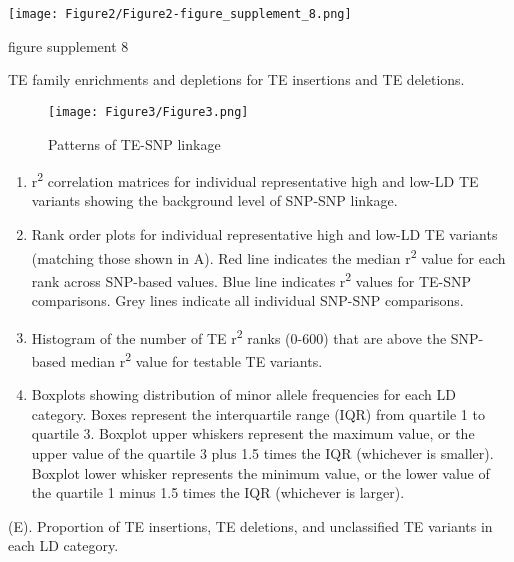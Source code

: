 \documentclass[12pt]{article}
\begin{document}
\pagebreak

\setcounter{suppfigure}{1}

\begin{suppfigure}[!ht]
  \centering
  \texttt{[image: Figure2/Figure2-figure\_supplement\_8.png]}
  \caption{figure supplement 8}
  \label{fig2s8}
\end{suppfigure}

TE family enrichments and depletions for TE insertions and TE deletions.

\pagebreak


\begin{figure}[!ht]
  \centering
  \texttt{[image: Figure3/Figure3.png]}
  \caption{Patterns of TE-SNP linkage}
  \label{fig3}
\end{figure}

\begin{enumerate}
  \def\labelenumi{(\Alph{enumi})}
\item
  r\textsuperscript{2} correlation matrices for individual representative high and low-LD
  TE variants showing the background level of SNP-SNP linkage.
\item
  Rank order plots for individual representative high and low-LD TE
  variants (matching those shown in A). Red line indicates the median r\textsuperscript{2}
  value for each rank across SNP-based values. Blue line indicates r\textsuperscript{2}
  values for TE-SNP comparisons. Grey lines indicate all individual
  SNP-SNP comparisons.
\item
  Histogram of the number of TE r\textsuperscript{2} ranks (0-600) that are above the
  SNP-based median r\textsuperscript{2} value for testable TE variants.
\item
  Boxplots showing distribution of minor allele frequencies for each LD
  category. Boxes represent the interquartile range (IQR) from quartile
  1 to quartile 3. Boxplot upper whiskers represent the maximum value,
  or the upper value of the quartile 3 plus 1.5 times the IQR (whichever
  is smaller). Boxplot lower whisker represents the minimum value, or
  the lower value of the quartile 1 minus 1.5 times the IQR (whichever
  is larger).
\end{enumerate}

(E). Proportion of TE insertions, TE deletions, and unclassified TE
variants in each LD category.

\pagebreak
\end{document}
